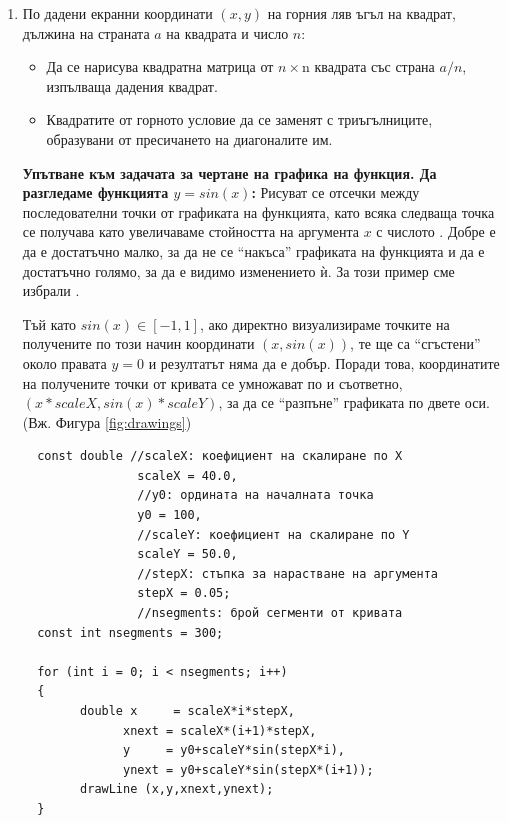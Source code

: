 {\begin{enumerate}[resume]
	\item По дадени екранни координати $(x,y)$ на горния ляв ъгъл на квадрат, дължина на страната $a$ на квадрата и число $n$:

	\begin{itemize}
		\item Да се нарисува квадратна матрица от $n \times $n квадрата със страна $a/n$, изпълваща дадения квадрат.
		\item Квадратите от горното условие да се заменят с триъгълниците, образувани от пресичането на диагоналите им.
	\end{itemize}




\begin{mdframed}[hidealllines=true,backgroundcolor=gray!20]
  \textbf {Упътване към задачата за чертане на графика на функция. Да разгледаме функцията $y=sin(x)$:} Рисуват се отсечки между последователни точки от графиката на функцията, като всяка следваща точка се получава като увеличаваме стойността на аргумента $x$ с числото . Добре е  да е достатъчно малко, за да не се ``накъса'' графиката на функцията и да е достатъчно голямо, за да е видимо изменението ѝ. За този пример сме избрали .
  
  Тъй като $sin(x)\in[-1,1]$, ако директно визуализираме точките на получените по този начин координати $(x,sin(x))$, те ще са ``сгъстени'' около правата $y=0$ и резултатът няма да е добър. Поради това, координатите на получените  точки от кривата се умножават по  и  съответно, $(x * scaleX,sin(x) * scaleY)$, за да се ``разпъне'' графиката по двете оси. (Вж. Фигура \ref{fig:drawings})\\

  \begin{mdframed}[hidealllines=true,backgroundcolor=lightgray!20]
  \begin{verbatim}
  const double //scaleX: коефициент на скалиране по X
                scaleX = 40.0,
                //y0: ордината на началната точка
                y0 = 100,
                //scaleY: коефициент на скалиране по Y
                scaleY = 50.0,
                //stepX: стъпка за нарастване на аргумента
                stepX = 0.05;
                //nsegments: брой сегменти от кривата
  const int nsegments = 300;

  for (int i = 0; i < nsegments; i++)
  {
        double x     = scaleX*i*stepX,
              xnext = scaleX*(i+1)*stepX,
              y     = y0+scaleY*sin(stepX*i),
              ynext = y0+scaleY*sin(stepX*(i+1));
        drawLine (x,y,xnext,ynext);
  }
  \end{verbatim}
  \end{mdframed}


\end{mdframed}
\end{enumerate}}
